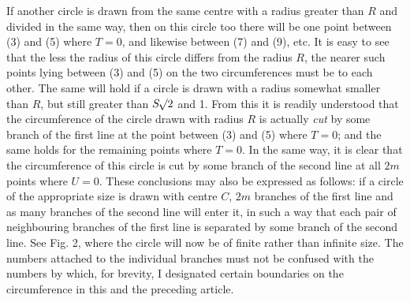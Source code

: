  If another circle is drawn from the same centre with a radius greater than $R$ and divided in the same way, then on this circle too there will be one point between (3) and (5) where $T=0$, and likewise between (7) and (9), etc. It is easy to see that the less the radius of this circle differs from the radius $R$, the nearer such points lying between (3) and (5) on the two circumferences must be to each other. The same will hold if a circle is drawn with a radius somewhat smaller than $R$, but still greater than $S\mathord{{}^{}\!\surd}2$ and 1. From this it is readily understood that the circumference of the circle drawn with radius $R$
is actually \textit{cut} by some branch of the first line at the point between (3) and (5) where $T=0$; and the same holds for the remaining points where $T=0$. In the same way, it is clear that the circumference of this circle is cut by some branch of the second line at all $2m$ points where $U=0$. These conclusions may also be expressed as follows: if a circle of the appropriate size is drawn with centre $C$, $2m$ branches of the first line and as many branches of the second line will enter it, in such a way that each pair of neighbouring branches of the first line is separated by some branch of the second line. See Fig. 2, where the circle will now be of finite rather than infinite size. The numbers attached to the individual branches must not be confused with the numbers by which, for brevity, I designated certain boundaries on the circumference in this and the preceding article.

